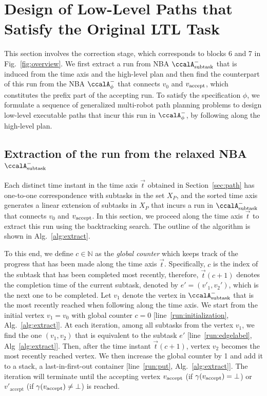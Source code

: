 \documentclass[Afour,sageh,times]{sagej}
\newcommand{\auto}[1]{\ccalA_{\textup{#1}}}
\newcommand{\autop}{\ccalA_{\phi}}
\newcommand{\vertex}[1]{v_{\textup{#1}}}
\begin{document}
{{  \section{Design of Low-Level Paths that Satisfy the Original LTL Task}\label{sec:solution2mrta}
 This section involves the correction stage, which corresponds to blocks 6 and 7 in Fig.~\ref{fig:overview}. We first extract a run from NBA $\auto{subtask}^-$ that is induced from the time axis and the high-level plan and then find the counterpart of this run from the NBA $\autop^-$ that connects $v_0$ and $\vertex{accept}$, which constitutes the prefix part of the accepting run. To satisfy the specification $\phi$, we formulate a sequence of generalized multi-robot path planning problems to design low-level executable paths that incur this run in $\autop^-$, by following along the high-level plan.
\subsection{Extraction of the run from the relaxed NBA \upshape $\auto{subtask}^-$}\label{sec:run}

Each distinct time instant in the time axis $\vec{t}$ obtained in Section~\ref{sec:path} has one-to-one correspondence with subtasks in the set $X_P$, and the sorted time axis generates a linear extension of subtasks in $X_P$ that incurs a run in $\auto{subtask}^-$ that connects $v_{0}$ and $\vertex{accept}$. In this section, we proceed along the time axis $\vec{t}$ to extract this run using the backtracking search. The outline of the algorithm is shown in Alg.~\ref{alg:extract}.

  To this end, we define $c\in \mathbb{N}$ as the {\it global counter} which keeps track of the progress that has been made along the time axis $\vec{t}$. Specifically, $c$ is the index of the subtask that  has  been completed most recently, therefore, $\vec{t}(c+1)$ denotes  the  completion time of the current subtask, denoted by $e' = (v'_1, v_2')$, which is  the next one to be completed. Let $v_1$ denote the vertex in $\auto{subtask}^-$ that is the  most recently reached when following along the time axis.  We start from the initial vertex $v_1= v_0$ with global counter $c=0$ [line~\ref{run:initialization}, Alg.~\ref{alg:extract}]. At each iteration, among all subtasks from the vertex $v_1$, we find the one $(v_1, v_2)$ that is  equivalent to the  subtask $e'$ [line~\ref{run:edgelabel}, Alg~\ref{alg:extract}]. Then, after the time instant $\vec{t}(c+1)$,  vertex $v_2$ becomes the most recently reached vertex. We then increase the global counter by 1 and add it to a stack, a last-in-first-out container [line~\ref{run:put}, Alg.~\ref{alg:extract}]. The iteration will terminate until the accepting vertex $\vertex{accept}$ (if $\gamma(\vertex{accept}) = \bot$) or $v'_{\text{accept}}$ (if $\gamma(\vertex{accept})\neq \bot$) is reached.


}}
\end{document}

